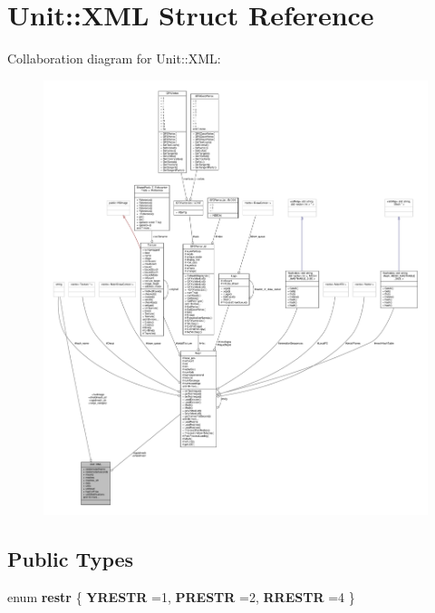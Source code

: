 \hypertarget{structUnit_1_1XML}{}\section{Unit\+:\+:X\+ML Struct Reference}
\label{structUnit_1_1XML}


Collaboration diagram for Unit\+:\+:X\+ML\+:
\nopagebreak
\begin{figure}[H]
\begin{center}
\leavevmode
\includegraphics[width=350pt]{df/d16/structUnit_1_1XML__coll__graph}
\end{center}
\end{figure}
\subsection*{Public Types}
\begin{DoxyCompactItemize}
\item 
enum {\bfseries restr} \{ {\bfseries Y\+R\+E\+S\+TR} =1, 
{\bfseries P\+R\+E\+S\+TR} =2, 
{\bfseries R\+R\+E\+S\+TR} =4
 \}\hypertarget{structUnit_1_1XML_ac558ac9841c7503b0840231a3749e308}{}\label{structUnit_1_1XML_ac558ac9841c7503b0840231a3749e308}

\end{DoxyCompactItemize}

